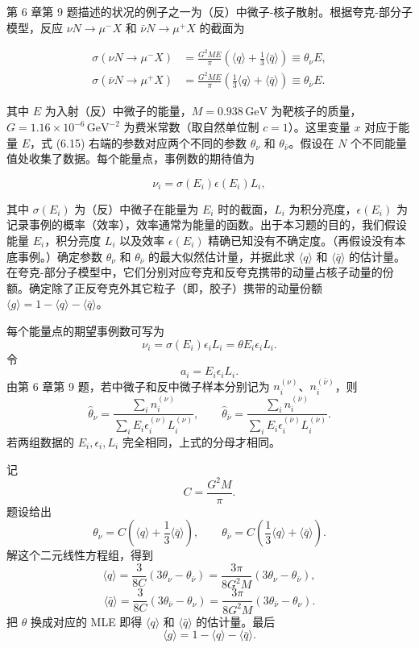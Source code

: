 \begin{question}
第 6 章第 9 题描述的状况的例子之一为（反）中微子-核子散射。根据夸克-部分子模型，反应
\(\nu N\to\mu^-X\) 和 \(\bar\nu N\to\mu^+X\) 的截面为

\[
\begin{split}
\sigma(\nu N\to\mu^-X)&=\frac{G^2ME}{\pi}\left(\langle q\rangle+\frac13\langle\bar q\rangle\right)\equiv\theta_\nu E,\\
\sigma(\bar\nu N\to\mu^+X)&=\frac{G^2ME}{\pi}\left(\frac13\langle q\rangle+\langle\bar q\rangle\right)\equiv\theta_{\bar\nu}E.
\end{split}
\]

其中 \(E\) 为入射（反）中微子的能量，\(M=0.938\,\mathrm{GeV}\)
为靶核子的质量，\(G=1.16\times10^{-6}\,\mathrm{GeV}^{-2}\)
为费米常数（取自然单位制 \(c=1\)）。这里变量 \(x\) 对应于能量 \(E\)，式
(6.15) 右端的参数对应两个不同的参数 \(\theta_\nu\) 和
\(\theta_{\bar\nu}\)。假设在 \(N\)
个不同能量值处收集了数据。每个能量点，事例数的期待值为

\[
\nu_i=\sigma(E_i)\epsilon(E_i)L_i,
\]

其中 \(\sigma(E_i)\) 为（反）中微子在能量为 \(E_i\) 时的截面，\(L_i\)
为积分亮度，\(\epsilon(E_i)\)
为记录事例的概率（效率），效率通常为能量的函数。出于本习题的目的，我们假设能量
\(E_i\)，积分亮度 \(L_i\) 以及效率 \(\epsilon(E_i)\)
精确已知没有不确定度。（再假设没有本底事例。）确定参数 \(\theta_\nu\) 和
\(\theta_{\bar\nu}\) 的最大似然估计量，并据此求 \(\langle q\rangle\) 和
\(\langle\bar q\rangle\)
的估计量。在夸克-部分子模型中，它们分别对应夸克和反夸克携带的动量占核子动量的份额。确定除了正反夸克外其它粒子（即，胶子）携带的动量份额
\(\langle g\rangle=1-\langle q\rangle-\langle\bar q\rangle\)。
\begin{solution}
每个能量点的期望事例数可写为
\[
\nu_i=\sigma(E_i)\epsilon_iL_i=\theta E_i\epsilon_iL_i.
\]
令
\[
a_i=E_i\epsilon_iL_i.
\]
由第 6 章第 9 题，若中微子和反中微子样本分别记为
\(n_i^{(\nu)}\)、\(n_i^{(\bar\nu)}\)，则
\[
\hat\theta_\nu=
\frac{\sum_i n_i^{(\nu)}}{\sum_i E_i\epsilon_i^{(\nu)}L_i^{(\nu)}},
\qquad
\hat\theta_{\bar\nu}=
\frac{\sum_i n_i^{(\bar\nu)}}{\sum_i E_i\epsilon_i^{(\bar\nu)}L_i^{(\bar\nu)}}.
\]
若两组数据的 \(E_i,\epsilon_i,L_i\) 完全相同，上式的分母才相同。

记
\[
C=\frac{G^2M}{\pi}.
\]
题设给出
\[
\theta_\nu=C\left(\langle q\rangle+\frac13\langle\bar q\rangle\right),
\qquad
\theta_{\bar\nu}=C\left(\frac13\langle q\rangle+\langle\bar q\rangle\right).
\]
解这个二元线性方程组，得到
\[
\langle q\rangle
=\frac{3}{8C}(3\theta_\nu-\theta_{\bar\nu})
=\frac{3\pi}{8G^2M}(3\theta_\nu-\theta_{\bar\nu}),
\]
\[
\langle\bar q\rangle
=\frac{3}{8C}(3\theta_{\bar\nu}-\theta_\nu)
=\frac{3\pi}{8G^2M}(3\theta_{\bar\nu}-\theta_\nu).
\]
把 \(\theta\) 换成对应的 MLE 即得 \(\langle q\rangle\) 和
\(\langle\bar q\rangle\) 的估计量。最后
\[
\langle g\rangle=1-\langle q\rangle-\langle\bar q\rangle.
\]

\end{solution}
\end{question}


